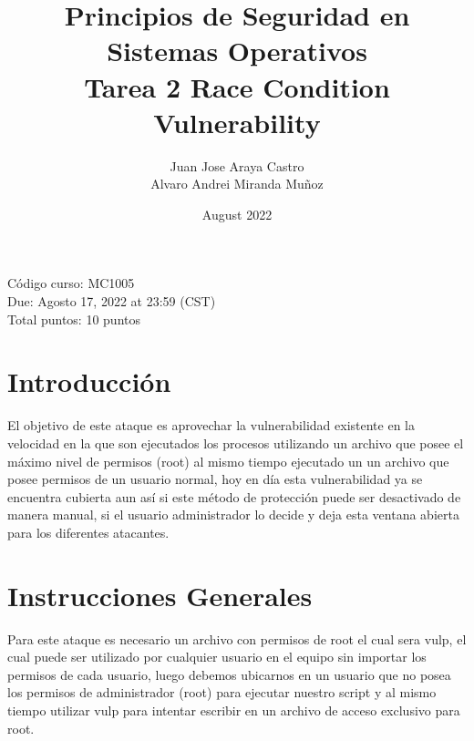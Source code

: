 \documentclass{article}
\title{Principios de Seguridad en Sistemas Operativos \\ Tarea 2 Race Condition Vulnerability}
\author{Juan Jose Araya Castro \\
Alvaro Andrei Miranda Muñoz}
\date{August 2022}
\begin{document}
\maketitle

\begin{minipage}{\textwidth}
Código curso: MC1005\\
Due: Agosto 17, 2022 at 23:59 (CST)\\
Total puntos: 10 puntos\\
\end{minipage}
    
\section*{Introducción}
El objetivo de este ataque es aprovechar la vulnerabilidad existente en la velocidad en la que son ejecutados los procesos utilizando un archivo que posee el máximo nivel de permisos (root) al mismo tiempo ejecutado un un archivo que posee permisos de un usuario normal, hoy en día esta vulnerabilidad ya se encuentra cubierta aun así si este método de protección puede ser desactivado de manera manual, si el usuario administrador lo decide y deja esta ventana abierta para los diferentes atacantes.

\section*{Instrucciones Generales}

Para este ataque es necesario un archivo con permisos de root el cual sera vulp, el cual puede ser utilizado por cualquier usuario en el equipo sin importar los permisos de cada usuario, luego debemos ubicarnos en un usuario que no posea los permisos de administrador (root) para ejecutar nuestro script y al mismo tiempo utilizar vulp para intentar escribir en un archivo de acceso exclusivo para root.
\end{document}

